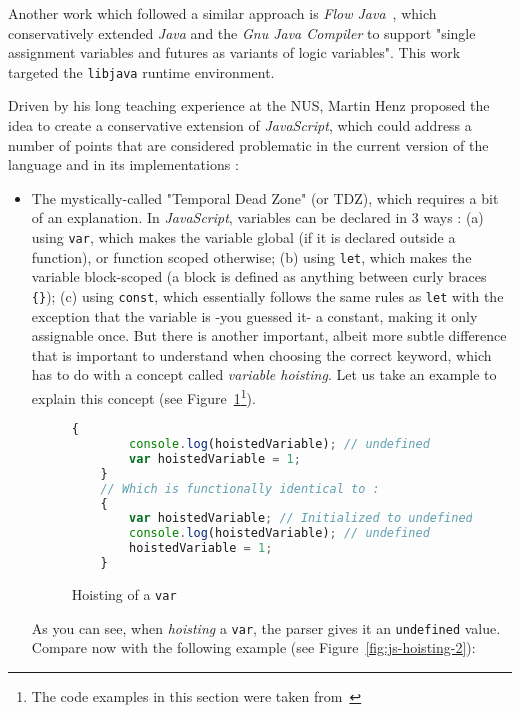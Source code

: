 Another work which followed a similar approach is \textit{Flow Java}~\cite{drejhammar2003flow}, which conservatively extended \textit{Java} and the \textit{Gnu Java Compiler} to support "single assignment variables and futures as variants of logic variables".
This work targeted the \texttt{libjava} runtime environment.\newline

Driven by his long teaching experience at the NUS, Martin Henz proposed the idea to create a conservative extension of \textit{JavaScript}, which could address a number of points that are considered problematic in the current version of the language and in its implementations :
\begin{itemize}
    \item The mystically-called "Temporal Dead Zone" (or TDZ), which requires a bit of an explanation.
    In \textit{JavaScript}, variables can be declared in 3 ways : (a) using \texttt{var}, which makes the variable global (if it is declared outside a function), or function scoped otherwise; (b) using \texttt{let}, which makes the variable block-scoped (a block is defined as anything between curly braces \texttt{\{\}}); (c) using \texttt{const}, which essentially follows the same rules as \texttt{let} with the exception that the variable is -you guessed it- a constant, making it only assignable once.
    But there is another important, albeit more subtle difference that is important to understand when choosing the correct keyword, which has to do with a concept called \textit{variable hoisting}.\newline
    Let us take an example to explain this concept (see Figure~\ref{fig:js-hoisting}\footnote{The code examples in this section were taken from~\cite{jsTDZ}}).
    \begin{figure}[H]
    \begin{lstlisting}[language=JavaScript]
    {
        console.log(hoistedVariable); // undefined
        var hoistedVariable = 1;
    }
    // Which is functionally identical to :
    {
        var hoistedVariable; // Initialized to undefined
        console.log(hoistedVariable); // undefined
        hoistedVariable = 1;
    }
    \end{lstlisting}
    \caption{Hoisting of a \texttt{var}}
    \label{fig:js-hoisting}
    \end{figure}
    As you can see, when \textit{hoisting} a \texttt{var}, the parser gives it an \texttt{undefined} value.
    Compare now with the following example (see Figure~\ref{fig:js-hoisting-2}):

\end{itemize}
